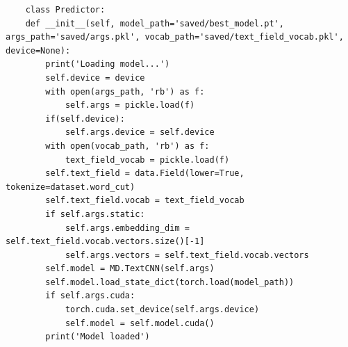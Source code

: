 \begin{mdframed}[backgroundcolor=darkgray, linecolor=lightgray, linewidth=1pt, innermargin=0.5cm, outermargin=0.5cm, skipbelow=0.1cm]
    \color{white}
    \begin{verbatim}
    class Predictor:
    def __init__(self, model_path='saved/best_model.pt', args_path='saved/args.pkl', vocab_path='saved/text_field_vocab.pkl', device=None):
        print('Loading model...')
        self.device = device
        with open(args_path, 'rb') as f:
            self.args = pickle.load(f)
        if(self.device):
            self.args.device = self.device
        with open(vocab_path, 'rb') as f:
            text_field_vocab = pickle.load(f)
        self.text_field = data.Field(lower=True, tokenize=dataset.word_cut)
        self.text_field.vocab = text_field_vocab
        if self.args.static:
            self.args.embedding_dim = self.text_field.vocab.vectors.size()[-1]
            self.args.vectors = self.text_field.vocab.vectors
        self.model = MD.TextCNN(self.args)
        self.model.load_state_dict(torch.load(model_path))
        if self.args.cuda:
            torch.cuda.set_device(self.args.device)
            self.model = self.model.cuda()
        print('Model loaded')
  \end{verbatim}  
  \end{mdframed}

